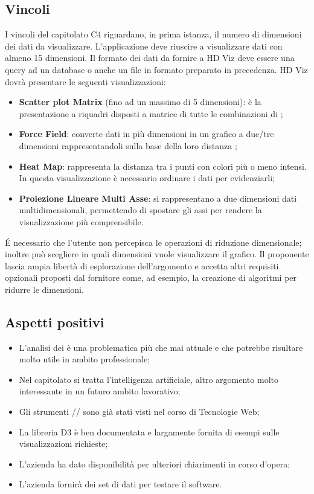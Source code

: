 \subsection{Vincoli}
I vincoli del capitolato C4 riguardano, in prima istanza, il numero di dimensioni dei dati da visualizzare. L'applicazione deve riuscire a visualizzare dati con almeno 15 dimensioni. 
Il formato dei dati da fornire a HD Viz deve essere una query ad un database o anche un file in formato  preparato in precedenza.
HD Viz dovrà presentare le seguenti visualizzazioni: 
\begin{itemize}
\item \textbf{Scatter plot Matrix} (fino ad un massimo di 5 dimensioni): è la presentazione a riquadri disposti a matrice di tutte le combinazioni di ; 
\item \textbf{Force Field}: converte dati in più dimensioni in un grafico a due/tre dimensioni rappresentandoli sulla base della loro distanza ; 
\item \textbf{Heat Map}: rappresenta la distanza tra i punti con colori più o meno intensi. In questa visualizzazione è necessario ordinare i dati per evidenziarli; 
\item \textbf{Proiezione Lineare Multi Asse}: si rappresentano a due dimensioni dati multidimensionali, permettendo di spostare gli assi per rendere la visualizzazione più comprensibile.  
\end{itemize} 
\'E necessario che l'utente non percepisca le operazioni di riduzione dimensionale; inoltre può scegliere in quali dimensioni vuole visualizzare il grafico.
Il proponente lascia ampia libertà di esplorazione dell'argomento e accetta altri requisiti opzionali proposti dal fornitore come, ad esempio, la creazione di algoritmi per ridurre le dimensioni.

\subsection{Aspetti positivi}
\begin{itemize}
\item L'analisi dei  è una problematica più che mai attuale e che potrebbe risultare molto utile in ambito professionale;
\item Nel capitolato si tratta l'intelligenza artificiale, altro argomento molto interessante in un futuro ambito lavorativo;
\item Gli strumenti // sono già stati visti nel corso di Tecnologie Web;
\item La libreria D3 è ben documentata e largamente fornita di esempi sulle visualizzazioni richieste;
\item L'azienda ha dato disponibilità per ulteriori chiarimenti in corso d'opera;
\item L'azienda fornirà dei set di dati per testare il software.
\end{itemize}

